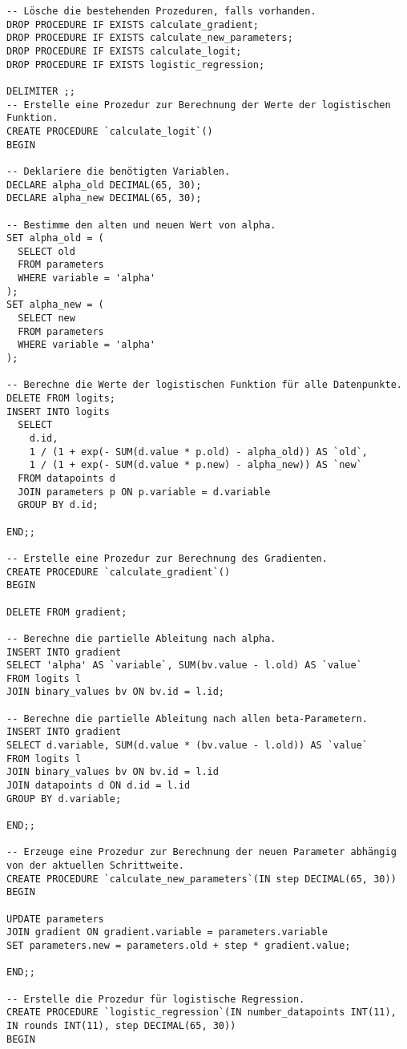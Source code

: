 \begin{verbatim}
-- Lösche die bestehenden Prozeduren, falls vorhanden.
DROP PROCEDURE IF EXISTS calculate_gradient;
DROP PROCEDURE IF EXISTS calculate_new_parameters;
DROP PROCEDURE IF EXISTS calculate_logit;
DROP PROCEDURE IF EXISTS logistic_regression;

DELIMITER ;;
-- Erstelle eine Prozedur zur Berechnung der Werte der logistischen Funktion.
CREATE PROCEDURE `calculate_logit`()
BEGIN

-- Deklariere die benötigten Variablen.
DECLARE alpha_old DECIMAL(65, 30);
DECLARE alpha_new DECIMAL(65, 30);

-- Bestimme den alten und neuen Wert von alpha.
SET alpha_old = (
  SELECT old
  FROM parameters
  WHERE variable = 'alpha'
);
SET alpha_new = (
  SELECT new
  FROM parameters
  WHERE variable = 'alpha'
);

-- Berechne die Werte der logistischen Funktion für alle Datenpunkte.
DELETE FROM logits;
INSERT INTO logits
  SELECT
    d.id,
    1 / (1 + exp(- SUM(d.value * p.old) - alpha_old)) AS `old`,
    1 / (1 + exp(- SUM(d.value * p.new) - alpha_new)) AS `new`
  FROM datapoints d
  JOIN parameters p ON p.variable = d.variable
  GROUP BY d.id;

END;;

-- Erstelle eine Prozedur zur Berechnung des Gradienten.
CREATE PROCEDURE `calculate_gradient`()
BEGIN

DELETE FROM gradient;

-- Berechne die partielle Ableitung nach alpha.
INSERT INTO gradient
SELECT 'alpha' AS `variable`, SUM(bv.value - l.old) AS `value`
FROM logits l
JOIN binary_values bv ON bv.id = l.id;

-- Berechne die partielle Ableitung nach allen beta-Parametern.
INSERT INTO gradient
SELECT d.variable, SUM(d.value * (bv.value - l.old)) AS `value`
FROM logits l
JOIN binary_values bv ON bv.id = l.id
JOIN datapoints d ON d.id = l.id
GROUP BY d.variable;

END;;

-- Erzeuge eine Prozedur zur Berechnung der neuen Parameter abhängig von der aktuellen Schrittweite.
CREATE PROCEDURE `calculate_new_parameters`(IN step DECIMAL(65, 30))
BEGIN

UPDATE parameters
JOIN gradient ON gradient.variable = parameters.variable
SET parameters.new = parameters.old + step * gradient.value;

END;;

-- Erstelle die Prozedur für logistische Regression.
CREATE PROCEDURE `logistic_regression`(IN number_datapoints INT(11), IN rounds INT(11), step DECIMAL(65, 30))
BEGIN


\end{verbatim}
